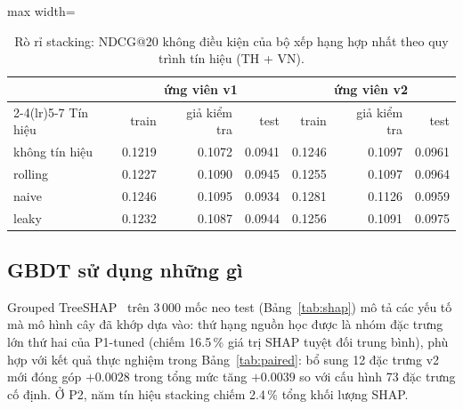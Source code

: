 \documentclass[jtehm]{ieeeaccess}
\begin{document}
\begin{table}[t]
\caption{Rò rỉ stacking: NDCG@20 không điều kiện của bộ xếp hạng hợp nhất theo quy trình tín hiệu (TH + VN).}
\label{tab:t29b}
\setlength{\tabcolsep}{3pt}
\centering
\begin{adjustbox}{max width=\columnwidth}
\begin{tabular}{lrrrrrr}
\toprule
 & \multicolumn{3}{c}{ứng viên v1} & \multicolumn{3}{c}{ứng viên v2} \\
\cmidrule(lr){2-4}\cmidrule(lr){5-7}
Tín hiệu & train & giả kiểm tra & test & train & giả kiểm tra & test \\
\midrule
không tín hiệu & 0.1219 & 0.1072 & 0.0941 & 0.1246 & 0.1097 & 0.0961 \\
rolling & 0.1227 & 0.1090 & 0.0945 & 0.1255 & 0.1097 & 0.0964 \\
naive   & 0.1246 & 0.1095 & 0.0934 & 0.1281 & 0.1126 & 0.0959 \\
leaky   & 0.1232 & 0.1087 & 0.0944 & 0.1256 & 0.1091 & 0.0975 \\
\bottomrule
\end{tabular}
\end{adjustbox}
\end{table}

\subsection{GBDT sử dụng những gì}
\label{sec:shap}
Grouped TreeSHAP~\cite{lundberg2020treeshap} trên 3\,000 mốc neo test (Bảng~\ref{tab:shap}) mô tả các yếu tố mà mô hình cây đã khớp dựa vào: thứ hạng nguồn học được là nhóm đặc trưng lớn thứ hai của P1-tuned (chiếm 16.5\,\% giá trị SHAP tuyệt đối trung bình), phù hợp với kết quả thực nghiệm trong Bảng~\ref{tab:paired}: bổ sung 12 đặc trưng v2 mới đóng góp $+0.0028$ trong tổng mức tăng $+0.0039$ so với cấu hình 73 đặc trưng cố định. Ở P2, năm tín hiệu stacking chiếm 2.4\,\% tổng khối lượng SHAP.
\end{document}

